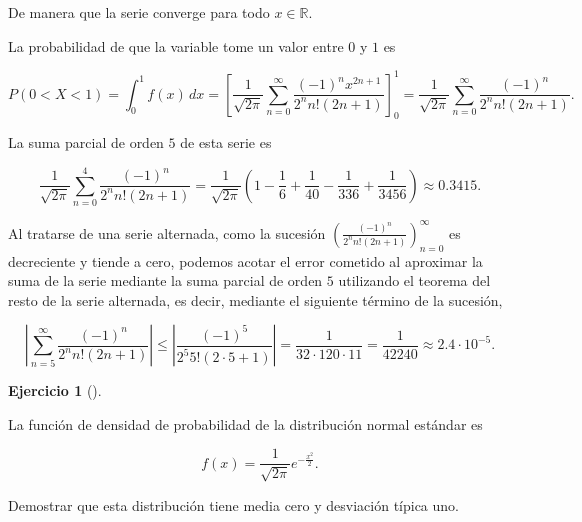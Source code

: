 \documentclass[
  a4paper,
]{scrreport}
\theoremstyle{definition}
\newtheorem{exercise}{Ejercicio}[chapter]
\theoremstyle{remark}
\begin{document}
\begin{tcolorbox}
De manera que la serie converge para todo \(x \in \mathbb{R}\).

La probabilidad de que la variable tome un valor entre \(0\) y \(1\) es

\[
P(0 < X < 1) 
= \int_0^1 f(x)\,dx
= \left[\frac{1}{\sqrt{2\pi}}\sum_{n=0}^\infty \frac{(-1)^n x^{2n+1}}{2^n n!(2n+1)}\right]_0^1 
= \frac{1}{\sqrt{2\pi}}\sum_{n=0}^\infty \frac{(-1)^n}{2^n n!(2n+1)}.
\]

La suma parcial de orden \(5\) de esta serie es

\[
\frac{1}{\sqrt{2\pi}}\sum_{n=0}^4 \frac{(-1)^n}{2^n n!(2n+1)}
= \frac{1}{\sqrt{2\pi}} \left( 1 - \frac{1}{6} + \frac{1}{40} - \frac{1}{336} + \frac{1}{3456} \right)
\approx 0.3415.
\]

Al tratarse de una serie alternada, como la sucesión
\(\left(\frac{(-1)^n}{2^n n!(2n+1)}\right)_{n=0}^\infty\) es decreciente
y tiende a cero, podemos acotar el error cometido al aproximar la suma
de la serie mediante la suma parcial de orden \(5\) utilizando el
teorema del resto de la serie alternada, es decir, mediante el siguiente
término de la sucesión,

\[
\left|\sum_{n=5}^\infty \frac{(-1)^n}{2^n n!(2n+1)}\right| 
\leq \left| \frac{(-1)^5}{2^5 5!(2\cdot 5 + 1)} \right|
= \frac{1}{32 \cdot 120 \cdot 11}
= \frac{1}{42240}
\approx 2.4 \cdot 10^{-5}.
\]

\end{tcolorbox}

\begin{exercise}[]\protect\hypertarget{exr-7}{}\label{exr-7}

La función de densidad de probabilidad de la distribución normal
estándar es

\[
f(x) = \frac{1}{\sqrt{2\pi}} e^{-\frac{x^2}{2}}.
\]

Demostrar que esta distribución tiene media cero y desviación típica
uno.

\end{exercise}
\end{document}
